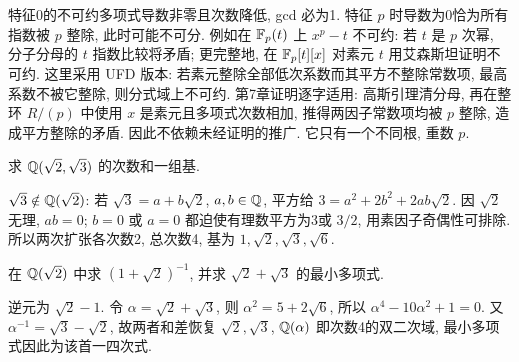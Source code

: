 特征0的不可约多项式导数非零且次数降低, gcd 必为1. 特征 $p$ 时导数为0恰为所有指数被 $p$ 整除, 此时可能不可分. 例如在 $\mathbb F_p(t)$ 上 $x^p-t$ 不可约: 若 $t$ 是 $p$ 次幂, 分子分母的 $t$ 指数比较将矛盾; 更完整地, 在 $\mathbb F_p[t][x]$ 对素元 $t$ 用艾森斯坦证明不可约. 这里采用 UFD 版本: 若素元整除全部低次系数而其平方不整除常数项, 最高系数不被它整除, 则分式域上不可约. 第7章证明逐字适用: 高斯引理清分母, 再在整环 $R/(p)$ 中使用 $x$ 是素元且多项式次数相加, 推得两因子常数项均被 $p$ 整除, 造成平方整除的矛盾. 因此不依赖未经证明的推广. 它只有一个不同根, 重数 $p$.
\begin{example}求 $\mathbb Q(\sqrt2,\sqrt3)$ 的次数和一组基.\end{example}
\begin{solution}
$\sqrt3\notin\mathbb Q(\sqrt2)$: 若 $\sqrt3=a+b\sqrt2$, $a,b\in\mathbb Q$, 平方给 $3=a^2+2b^2+2ab\sqrt2$. 因 $\sqrt2$ 无理, $ab=0$; $b=0$ 或 $a=0$ 都迫使有理数平方为3或 $3/2$, 用素因子奇偶性可排除. 所以两次扩张各次数2, 总次数4, 基为 $1,\sqrt2,\sqrt3,\sqrt6$.
\end{solution}
\begin{exercise}在 $\mathbb Q(\sqrt2)$ 中求 $(1+\sqrt2)^{-1}$, 并求 $\sqrt2+\sqrt3$ 的最小多项式.\end{exercise}
\begin{solution}
逆元为 $\sqrt2-1$. 令 $\alpha=\sqrt2+\sqrt3$, 则 $\alpha^2=5+2\sqrt6$, 所以 $\alpha^4-10\alpha^2+1=0$. 又 $\alpha^{-1}=\sqrt3-\sqrt2$, 故两者和差恢复 $\sqrt2,\sqrt3$, $\mathbb Q(\alpha)$ 即次数4的双二次域, 最小多项式因此为该首一四次式.
\end{solution}
